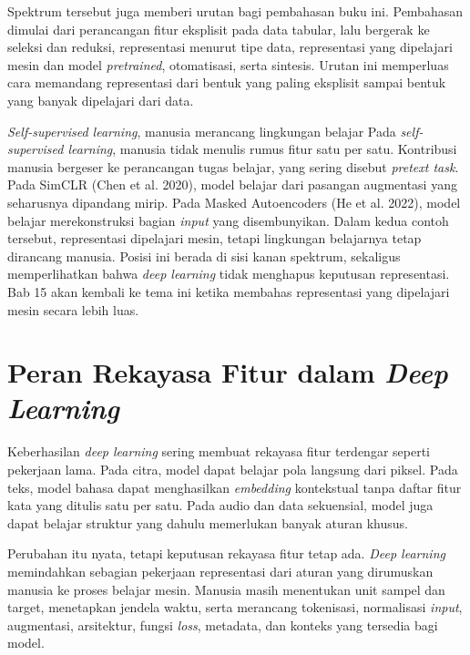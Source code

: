 Spektrum tersebut juga memberi urutan bagi pembahasan buku ini. Pembahasan dimulai dari perancangan fitur eksplisit pada data tabular, lalu bergerak ke seleksi dan reduksi, representasi menurut tipe data, representasi yang dipelajari mesin dan model \emph{pretrained}, otomatisasi, serta sintesis. Urutan ini memperluas cara memandang representasi dari bentuk yang paling eksplisit sampai bentuk yang banyak dipelajari dari data.

\begin{pendalaman}{\emph{Self-supervised learning}, manusia merancang lingkungan belajar}
Pada \emph{self-supervised learning}, manusia tidak menulis rumus fitur satu per satu. Kontribusi manusia bergeser ke perancangan tugas belajar, yang sering disebut \emph{pretext task}. Pada SimCLR (Chen et al. 2020), model belajar dari pasangan augmentasi yang seharusnya dipandang mirip. Pada Masked Autoencoders (He et al. 2022), model belajar merekonstruksi bagian \emph{input} yang disembunyikan. Dalam kedua contoh tersebut, representasi dipelajari mesin, tetapi lingkungan belajarnya tetap dirancang manusia. Posisi ini berada di sisi kanan spektrum, sekaligus memperlihatkan bahwa \emph{deep learning} tidak menghapus keputusan representasi. Bab 15 akan kembali ke tema ini ketika membahas representasi yang dipelajari mesin secara lebih luas.
\end{pendalaman}

\section{\texorpdfstring{Peran Rekayasa Fitur dalam \emph{Deep Learning}}{Peran Rekayasa Fitur dalam Deep Learning}}\label{peran-rekayasa-fitur-dalam-deep-learning}

Keberhasilan \emph{deep learning} sering membuat rekayasa fitur terdengar seperti pekerjaan lama. Pada citra, model dapat belajar pola langsung dari piksel. Pada teks, model bahasa dapat menghasilkan \emph{embedding} kontekstual tanpa daftar fitur kata yang ditulis satu per satu. Pada audio dan data sekuensial, model juga dapat belajar struktur yang dahulu memerlukan banyak aturan khusus.

Perubahan itu nyata, tetapi keputusan rekayasa fitur tetap ada. \emph{Deep learning} memindahkan sebagian pekerjaan representasi dari aturan yang dirumuskan manusia ke proses belajar mesin. Manusia masih menentukan unit sampel dan target, menetapkan jendela waktu, serta merancang tokenisasi, normalisasi \emph{input}, augmentasi, arsitektur, fungsi \emph{loss}, metadata, dan konteks yang tersedia bagi model.

